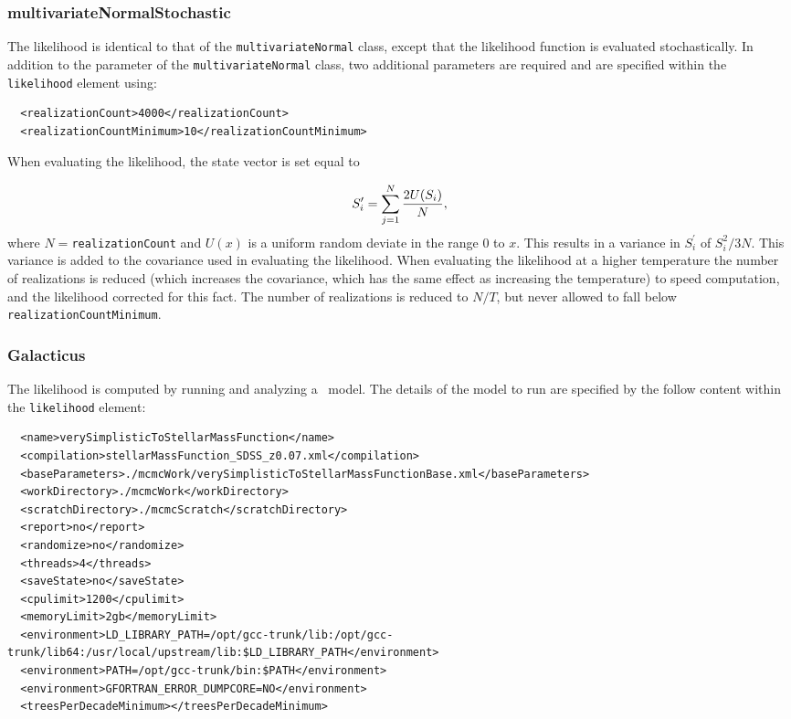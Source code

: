 \subsubsection{multivariateNormalStochastic}

The likelihood is identical to that of the {\tt multivariateNormal} class, except that the likelihood function is evaluated stochastically. In addition to the parameter of the {\tt multivariateNormal} class, two additional parameters are required and are specified within the {\tt likelihood} element using:
\begin{verbatim}
  <realizationCount>4000</realizationCount>
  <realizationCountMinimum>10</realizationCountMinimum>
\end{verbatim}
When evaluating the likelihood, the state vector is set equal to 

\begin{equation}
 S^\prime_i = \sum_{j=1}^N {2 U(S_i) \over N},
\end{equation}
where $N=${\tt realizationCount} and $U(x)$ is a uniform random deviate in the range $0$ to $x$. This results in a variance in $S^\prime_i$ of $S_i^2/3N$. This variance is added to the covariance used in evaluating the likelihood. When evaluating the likelihood at a higher temperature the number of realizations is reduced (which increases the covariance, which has the same effect as increasing the temperature) to speed computation, and the likelihood corrected for this fact. The number of realizations is reduced to $N/T$, but never allowed to fall below {\tt realizationCountMinimum}.

\subsubsection{Galacticus}

The likelihood is computed by running and analyzing a \glc\ model. The details of the model to run are specified by the follow content within the {\tt likelihood} element:
\begin{verbatim}
  <name>verySimplisticToStellarMassFunction</name>
  <compilation>stellarMassFunction_SDSS_z0.07.xml</compilation>
  <baseParameters>./mcmcWork/verySimplisticToStellarMassFunctionBase.xml</baseParameters>
  <workDirectory>./mcmcWork</workDirectory>
  <scratchDirectory>./mcmcScratch</scratchDirectory>
  <report>no</report>
  <randomize>no</randomize>
  <threads>4</threads>
  <saveState>no</saveState>
  <cpulimit>1200</cpulimit>
  <memoryLimit>2gb</memoryLimit>
  <environment>LD_LIBRARY_PATH=/opt/gcc-trunk/lib:/opt/gcc-trunk/lib64:/usr/local/upstream/lib:$LD_LIBRARY_PATH</environment>
  <environment>PATH=/opt/gcc-trunk/bin:$PATH</environment>
  <environment>GFORTRAN_ERROR_DUMPCORE=NO</environment>
  <treesPerDecadeMinimum></treesPerDecadeMinimum>
\end{verbatim}

